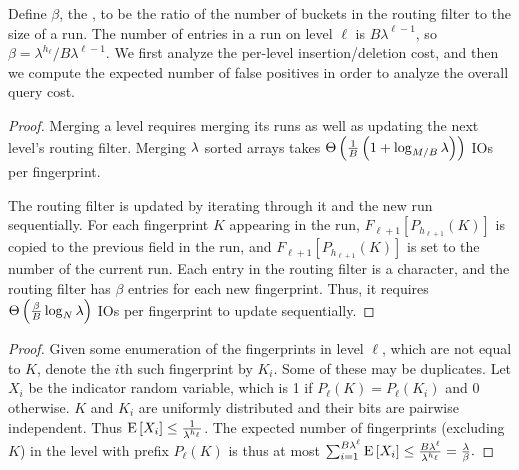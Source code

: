 Define $\beta$, the , to be the ratio of the number
of buckets in the routing filter to the size of a run. The number of entries in
a run on level $\ell$ is $B\lambda^{\ell-1}$, so $\beta =
\lambda^{h_\ell}/B\lambda^{\ell-1}$. We first analyze the per-level
insertion/deletion cost, and then we compute the expected number of false
positives in order to analyze the overall query cost.


\begin{proof}
	Merging a level requires merging its runs as well as updating the
	next level's routing filter. Merging $\lambda$ sorted arrays takes
	$\Theta\left(\frac{1}{B}\left(1 + \log_{M/B}\lambda\right)\right)$ IOs per
	fingerprint.
			
	The routing filter is updated by iterating through it and the new run
	sequentially. For each fingerprint $K$ appearing in the run,
	$F_{\ell+1}[P_{h_{\ell+1}}(K)]$ is copied to the previous field in the run,
	and $F_{\ell+1}[P_{h_{\ell+1}}(K)]$ is set to the number of the current
	run. Each entry in the routing filter is a character, and the routing
	filter has $\beta$ entries for each new fingerprint. Thus, it requires
	$\Theta\left(\frac{\beta}{B}\log_{N}{\lambda}\right)$ IOs per fingerprint to
	update sequentially. 
\end{proof}


\begin{proof}
	Given some enumeration of the fingerprints in level $\ell$, which are not
	equal to $K$, denote the $i$th such fingerprint by $K_i$. Some of these may
	be duplicates. Let $X_i$ be the indicator random variable, which is 1
	if $P_\ell(K)=P_\ell(K_i)$ and 0 otherwise. $K$ and $K_i$ are
	uniformly distributed and their bits are pairwise independent.  Thus
	$\mathrm{E}\left[X_i\right] \leq \frac{1}{\lambda^{h_\ell}}$. The expected number of
	fingerprints (excluding $K$) in the level with prefix $P_\ell(K)$ is thus
	at most $\sum_{i=1}^{B \lambda^\ell}\mathrm{E}\left[X_i\right] \leq \frac{B
	\lambda^\ell}{\lambda^{h_\ell}} = \frac{\lambda}{\beta}.$
\end{proof}

